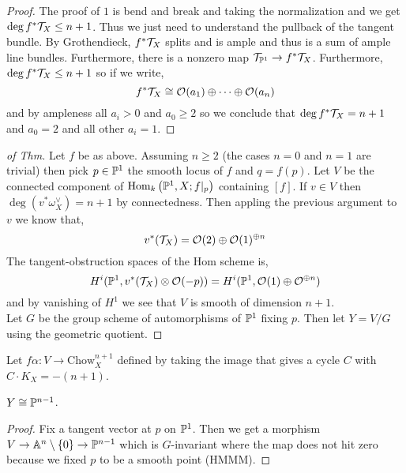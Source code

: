 \documentclass[12pt]{article}
\newcommand{\fixHom}[4]{\mathrm{Hom}_{#1} \left( #2, #3 ; #4 \right)}
\begin{document}
\begin{proof}
The proof of $1$ is bend and break and taking the normalization and we get $\deg{f^* \T_X} \le n + 1$. Thus we just need to understand the pullback of the tangent bundle. By Grothendieck, $f^* \T_X$ splits and is ample and thus is a sum of ample line bundles. Furthermore, there is a nonzero map $\T_{\P^1} \to f^* \T_{X}$. Furthermore, $\deg{f^* \T_X} \le n + 1$ so if we write,
\[ f^* \T_X \cong \struct{}(a_1) \oplus \cdots \oplus \struct{}(a_n) \]
and by ampleness all $a_i > 0$ and $a_0 \ge 2$ so we conclude that $\deg{f^* \T_X} = n+1$ and $a_0 = 2$ and all other $a_i = 1$.
\end{proof}

\begin{proof}[of Thm]
Let $f$ be as above. Assuming $n \ge 2$ (the cases $n = 0$ and $n = 1$ are trivial) then pick $p \in \P^1$ the smooth locus of $f$ and $q = f(p)$. Let $V$ be the connected component of $\fixHom{k}{\P^1}{X}{f|_p}$ containing $[f]$. If $v \in V$ then $\deg{(v^* \omega_X^\vee)} =  n+1$ by connectedness. Then appling the previous argument to $v$ we know that,
\[ v^* (\T_X) = \struct{}(2) \oplus \struct{}(1)^{\oplus n} \]
The tangent-obstruction spaces of the Hom scheme is,
\[ H^i(\P^1, v^*(\T_X) \ot \struct{}(-p)) = H^i(\P^1, \struct{}(1) \oplus \struct{}^{\oplus n}) \]
and by vanishing of $H^1$ we see that $V$ is smooth of dimension $n+1$. 
\bigskip\\
Let $G$ be the group scheme of automorphisms of $\P^1$ fixing $p$. Then let $Y = V / G$ using the geometric quotient. 
\end{proof}

\begin{defn}
Let $f  \alpha : V \to \mathrm{Chow}_X^{n+1}$ defined by taking the image that gives a cycle $C$ with $C \cdot K_X = - (n+1)$. 
\end{defn}

\begin{thm}
$Y \cong \P^{n-1}$. 
\end{thm}

\begin{proof}
Fix a tangent vector at $p$ on $\P^1$. Then we get a morphism $V \to \A^n \setminus \{ 0 \} \to \P^{n-1}$ which is $G$-invariant where the map does not hit zero because we fixed $p$ to be a smooth point (HMMM).  
\end{proof}
\end{document}
